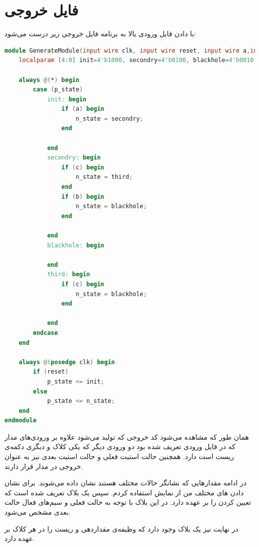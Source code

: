 \documentclass[]{article}
\begin{document}
\section*{فایل خروجی}
با دادن فایل ورودی بالا به برنامه فایل خروجی زیر درست می‌شود:
\begin{latin}
\begin{lstlisting}[language=verilog]
module GenerateModule(input wire clk, input wire reset, input wire a,input wire b,input wire c, output reg n_state, output reg p_state);
	localparam [4:0] init=4'b1000, secondry=4'b0100, blackhole=4'b0010, third=4'b0001;

	always @(*) begin
		case (p_state)
			init: begin
				if (a) begin
					n_state = secondry;
				end

			end
			secondry: begin
				if (c) begin
					n_state = third;
				end
				if (b) begin
					n_state = blackhole;
				end

			end
			blackhole: begin

			end
			third: begin
				if (c) begin
					n_state = blackhole;
				end

			end
		endcase
	end

	always @(posedge clk) begin
		if (reset)
			p_state <= init;
		else
			p_state <= n_state;
	end
endmodule
\end{lstlisting}
\end{latin}
همان طور که مشاهده می‌شود کد خروجی که تولید می‌شود علاوه بر ورودی‌های مدار که در فایل ورودی
تعریف شده بود دو ورودی دیگر که یکی کلاک و دیگری دکمه‌ی ریست است دارد.
همچنین حالت استیت فعلی و حالت استیت بعدی نیز به عنوان خروجی در مدار قرار دارند.

در ادامه مقدار‌هایی که نشانگر حالات مختلف هستند نشان داده می‌شوند. برای نشان دادن
های
مختلف من از نمایش
استفاده کردم.
سپس یک بلاک
تعریف شده است که تعیین کردن
را بر عهده دارد. در این بلاک با توجه به حالت فعلی و سیم‌های فعال حالت بعدی مشخص می‌شود.

در نهایت نیز یک بلاک
وجود دارد که وظیفه‌ی مقداردهی
 و ریست
را در هر کلاک بر عهده دارد.
\end{document}
